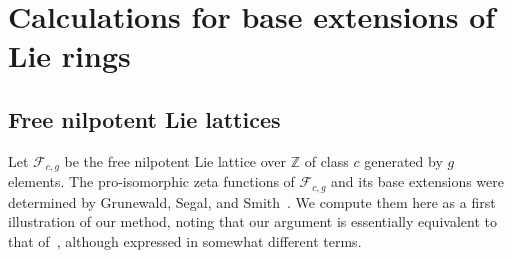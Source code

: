 \documentclass[11pt,a4paper]{amsart}
\theoremstyle{plain}
\theoremstyle{remark}
\newcommand{\Z}{\mathbb{Z}}
\begin{document}
\section{Calculations for base extensions of Lie rings} \label{sec:examples}
\subsection{Free nilpotent Lie lattices} \label{sec:free}
Let $\mathcal{F}_{c,g}$ be the free nilpotent Lie lattice over $\Z$ of class $c$ generated by $g$ elements.  The pro-isomorphic zeta functions of $\mathcal{F}_{c,g}$ and its base extensions were determined by Grunewald, Segal, and Smith~\cite[Theorem~7.1]{GSS/88}.  We compute them here as a first illustration of our method, noting that our argument is essentially equivalent to that of~\cite{GSS/88}, although expressed in somewhat different terms.
\end{document}
